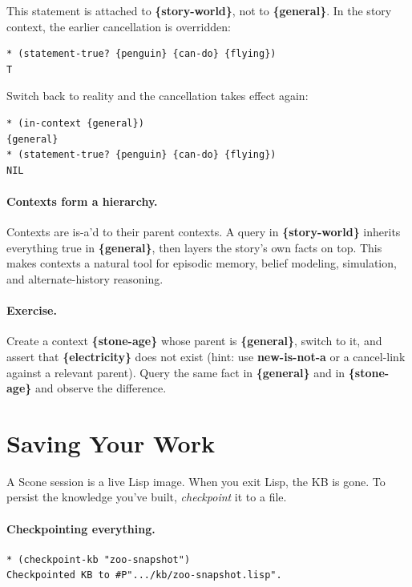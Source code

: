 \documentclass[titlepage,twoside,openright,11pt]{article}
\begin{document}
This statement is attached to \textbf{\{story-world\}}, not to
\textbf{\{general\}}. In the story context, the earlier cancellation
is overridden:

\begin{verbatim}
* (statement-true? {penguin} {can-do} {flying})
T
\end{verbatim}

Switch back to reality and the cancellation takes effect again:

\begin{verbatim}
* (in-context {general})
{general}
* (statement-true? {penguin} {can-do} {flying})
NIL
\end{verbatim}

\paragraph{Contexts form a hierarchy.}
Contexts are is-a'd to their parent contexts. A query in
\textbf{\{story-world\}} inherits everything true in
\textbf{\{general\}}, then layers the story's own facts on top.
This makes contexts a natural tool for episodic memory, belief
modeling, simulation, and alternate-history reasoning.

\paragraph{Exercise.}
Create a context \textbf{\{stone-age\}} whose parent is
\textbf{\{general\}}, switch to it, and assert that
\textbf{\{electricity\}} does not exist (hint: use
\textbf{new-is-not-a} or a cancel-link against a relevant parent).
Query the same fact in \textbf{\{general\}} and in
\textbf{\{stone-age\}} and observe the difference.

\section{Saving Your Work}\label{saving-your-work}

A Scone session is a live Lisp image. When you exit Lisp, the KB
is gone. To persist the knowledge you've built, \emph{checkpoint}
it to a file.

\paragraph{Checkpointing everything.}

\begin{verbatim}
* (checkpoint-kb "zoo-snapshot")
Checkpointed KB to #P".../kb/zoo-snapshot.lisp".
\end{verbatim}
\end{document}
